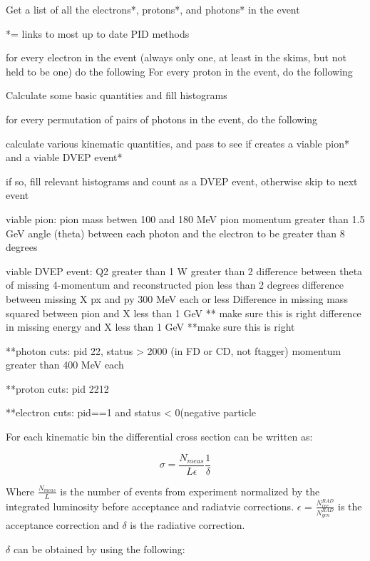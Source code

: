 Get a list of all the electrons*, protons*, and photons* in the event

*= links to most up to date PID methods

for every electron in the event (always only one, at least in the skims, but not held to be one) do the following
For every proton in the event, do the following

Calculate some basic quantities and fill histograms

for every permutation of pairs of photons in the event, do the following

calculate various kinematic quantities, and pass to see if creates a viable pion* and a viable DVEP event*

if so, fill relevant histograms and count as a DVEP event, otherwise skip to next event

viable pion: 
pion mass betwen 100 and 180 MeV
pion momentum greater than 1.5 GeV
angle (theta) between each photon and the electron to be greater than 8 degrees

viable DVEP event:
Q2 greater than 1
W greater than 2
difference between theta of missing 4-momentum and reconstructed pion less than 2 degrees
difference between missing X px and py 300 MeV each or less
Difference in missing mass squared between pion and X less than 1 GeV ** make sure this is right
difference in missing energy and X less than 1 GeV **make sure this is right

**photon cuts:
pid 22, status > 2000 (in FD or CD, not ftagger)
momentum greater than 400 MeV each

**proton cuts: pid 2212

**electron cuts: pid==1 and status < 0(negative particle






For each kinematic bin the differential cross section can be written as:

\begin{equation}
    \sigma = \frac{N_{meas}}{L \epsilon}\frac{1}{\delta}
\end{equation}

Where $\frac{N_{meas}}{L}$ is the number of events from experiment normalized by the integrated luminosity before acceptance and radiatvie corrections. $\epsilon$ = $\frac{N^{RAD}_{rec}}{{N^{RAD}_{gen}}}$ is the acceptance correction and $\delta$ is the radiative correction.



$\delta$ can be obtained by using the following:

